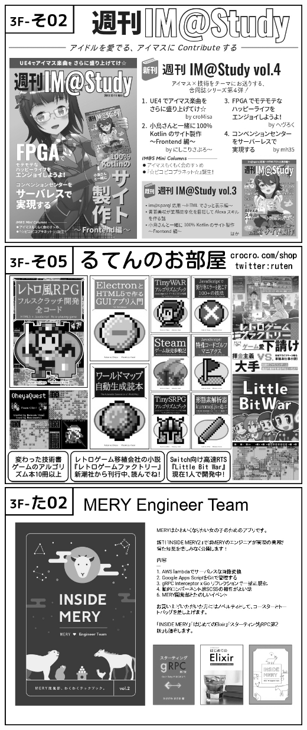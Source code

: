 \begin{center}
\includegraphics[width=0.9\linewidth]{images/circle-appeals/3F-そ02.jpg}
\includegraphics[width=0.9\linewidth]{images/circle-appeals/3F-そ05.jpg}
\includegraphics[width=0.9\linewidth]{images/circle-appeals/3F-た02.jpg}

\end{center}
